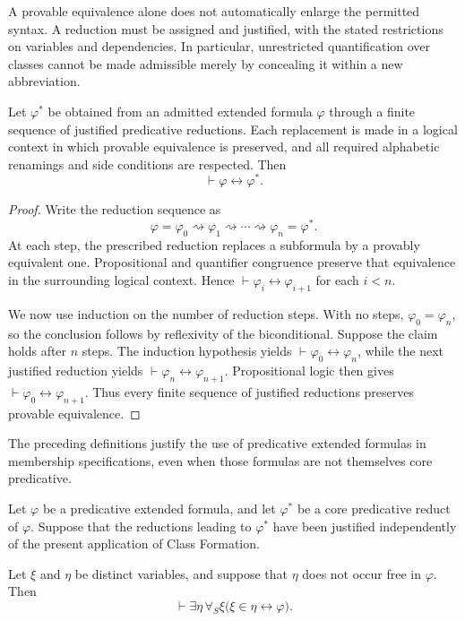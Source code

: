 A provable equivalence alone does not automatically enlarge the permitted syntax. A reduction must be assigned and justified, with the stated restrictions on variables and dependencies. In particular, unrestricted quantification over classes cannot be made admissible merely by concealing it within a new abbreviation.


\begin{metatheorem}
\label{meta:equivalence-of-predicative-reductions}
Let \(\varphi^\ast\) be obtained from an admitted extended formula
\(\varphi\) through a finite sequence of justified predicative
reductions. Each replacement is made in a logical context in which
provable equivalence is preserved, and all required alphabetic
renamings and side conditions are respected. Then
\[
\vdash\varphi\leftrightarrow\varphi^\ast.
\]
\end{metatheorem}

\begin{proof}
Write the reduction sequence as
\[
\varphi=\varphi_0\rightsquigarrow\varphi_1
\rightsquigarrow\cdots\rightsquigarrow\varphi_n=\varphi^\ast.
\]
At each step, the prescribed reduction replaces a subformula by a
provably equivalent one. Propositional and quantifier congruence
preserve that equivalence in the surrounding logical context. Hence
\(\vdash\varphi_i\leftrightarrow\varphi_{i+1}\) for each \(i<n\).

We now use induction on the number of reduction steps. With no steps,
\(\varphi_0=\varphi_n\), so the conclusion follows by reflexivity
of the biconditional. Suppose the claim holds after \(n\) steps.
The induction hypothesis yields
\(\vdash\varphi_0\leftrightarrow\varphi_n\), while the next
justified reduction yields
\(\vdash\varphi_n\leftrightarrow\varphi_{n+1}\).
Propositional logic
then gives
\(\vdash\varphi_0\leftrightarrow\varphi_{n+1}\).
Thus every finite sequence of justified reductions preserves
provable equivalence.
\end{proof}


The preceding definitions justify the use of predicative extended formulas in membership specifications, even when those formulas are not themselves core predicative.

\begin{metatheorem}
\label{meta:class-formation-by-predicative-reduction}
Let \(\varphi\) be a predicative extended formula, and let
\(\varphi^\ast\) be a core predicative reduct of \(\varphi\).
Suppose that the reductions leading to \(\varphi^\ast\) have been
justified independently of the present application of Class Formation.

Let \(\xi\) and \(\eta\) be distinct variables, and suppose that
\(\eta\) does not occur free in \(\varphi\). Then
\[
\vdash
\exists\eta\,\forall_S\xi
\bigl(\xi\in\eta\leftrightarrow\varphi\bigr).
\]
\end{metatheorem}

